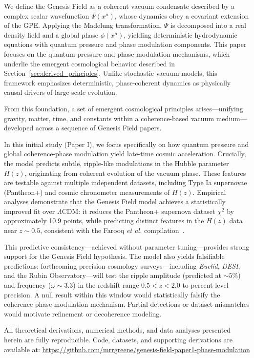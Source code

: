 We define the Genesis Field as a coherent vacuum condensate described by a complex scalar wavefunction \( \Psi(x^\mu) \), whose dynamics obey a covariant extension of the GPE. Applying the Madelung transformation, \( \Psi \) is decomposed into a real density field and a global phase \( \phi(x^\mu) \), yielding deterministic hydrodynamic equations with quantum pressure and phase modulation components. This paper focuses on the quantum-pressure and phase-modulation mechanisms, which underlie the emergent cosmological behavior described in Section~\ref{sec:derived_principles}. Unlike stochastic vacuum models, this framework emphasizes deterministic, phase-coherent dynamics as physically causal drivers of large-scale evolution.

From this foundation, a set of emergent cosmological principles arises—unifying gravity, matter, time, and constants within a coherence-based vacuum medium—developed across a sequence of Genesis Field papers.

In this initial study (Paper I), we focus specifically on how quantum pressure and global coherence-phase modulation yield late-time cosmic acceleration. Crucially, the model predicts subtle, ripple-like modulations in the Hubble parameter \( H(z) \), originating from coherent evolution of the vacuum phase. These features are testable against multiple independent datasets, including Type Ia supernovae (Pantheon+) and cosmic chronometer measurements of \( H(z) \). Empirical analyses demonstrate that the Genesis Field model achieves a statistically improved fit over \(\Lambda\)CDM: it reduces the Pantheon+ supernova dataset \(\chi^2\) by approximately 10.9 points, while predicting distinct features in the \( H(z) \) data near \( z \sim 0.5 \), consistent with the Farooq \textit{et al.} compilation~\cite{Farooq2017}.

This predictive consistency—achieved without parameter tuning—provides strong support for the Genesis Field hypothesis. The model also yields falsifiable predictions: forthcoming precision cosmology surveys—including \textit{Euclid}, \textit{DESI}, and the Rubin Observatory—will test the ripple amplitude (predicted at \(\sim 5\%\)) and frequency (\( \omega \sim 3.3 \)) in the redshift range \( 0.5 < z < 2.0 \) to percent-level precision. A null result within this window would statistically falsify the coherence-phase modulation mechanism. Partial detections or dataset mismatches would motivate refinement or decoherence modeling.

All theoretical derivations, numerical methods, and data analyses presented herein are fully reproducible. Code, datasets, and supporting derivations are available at:\newline
\url{https://github.com/mrrgreene/genesis-field-paper1-phase-modulation}

